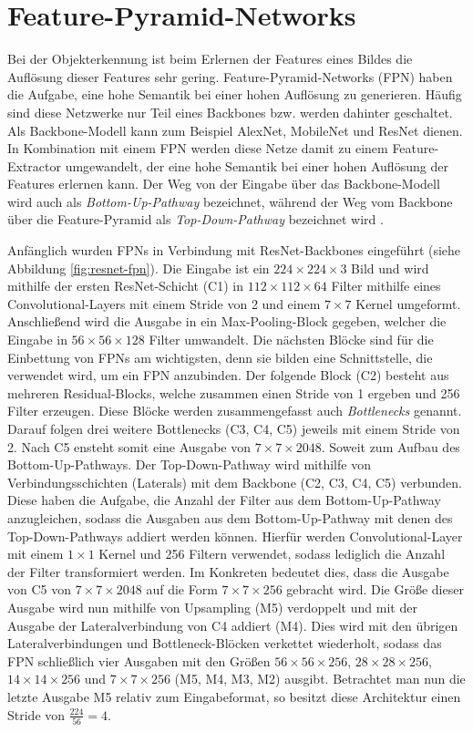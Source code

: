 \section{Feature-Pyramid-Networks}
Bei der Objekterkennung ist beim Erlernen der Features eines Bildes die
Auflösung dieser Features sehr gering. Feature-Pyramid-Networks (FPN) haben die
Aufgabe, eine hohe Semantik bei einer hohen Auflösung zu generieren. Häufig sind
diese Netzwerke nur Teil eines Backbones bzw. werden dahinter geschaltet. Als
Backbone-Modell kann zum Beispiel AlexNet, MobileNet und ResNet dienen. In
Kombination mit einem FPN werden diese Netze damit zu einem Feature-Extractor
umgewandelt, der eine hohe Semantik bei einer hohen Auflösung der Features
erlernen kann. Der Weg von der Eingabe über das Backbone-Modell wird auch als
\textit{Bottom-Up-Pathway} bezeichnet, während der Weg vom Backbone über die
Feature-Pyramid als \textit{Top-Down-Pathway} bezeichnet wird
\cite{lin2017feature}.

Anfänglich wurden FPNs in Verbindung mit ResNet-Backbones eingeführt (siehe
Abbildung \ref{fig:resnet-fpn}). Die Eingabe ist ein $224 \times 224 \times 3$
Bild und wird mithilfe der ersten ResNet-Schicht (C1) in $112 \times 112 \times
64$ Filter mithilfe eines Convolutional-Layers mit einem Stride von 2 und einem
$7 \times 7$ Kernel umgeformt. Anschließend wird die Ausgabe in ein
Max-Pooling-Block gegeben, welcher die Eingabe in $56 \times 56 \times 128$
Filter umwandelt. Die nächsten Blöcke sind für die Einbettung von FPNs am
wichtigsten, denn sie bilden eine Schnittstelle, die verwendet wird, um ein FPN anzubinden. Der folgende Block (C2) besteht aus mehreren Residual-Blocks,
welche zusammen einen Stride von 1 ergeben und 256 Filter erzeugen. Diese Blöcke
werden zusammengefasst auch \textit{Bottlenecks} genannt. Darauf folgen drei
weitere Bottlenecks (C3, C4, C5) jeweils mit einem Stride von 2. Nach C5 ensteht
somit eine Ausgabe von $7 \times 7 \times 2048$. Soweit zum Aufbau des
Bottom-Up-Pathways. Der Top-Down-Pathway wird mithilfe von Verbindungsschichten
(Laterals) mit dem Backbone (C2, C3, C4, C5) verbunden. Diese haben die Aufgabe, die Anzahl der
Filter aus dem Bottom-Up-Pathway anzugleichen, sodass die Ausgaben aus dem Bottom-Up-Pathway mit denen des Top-Down-Pathways addiert werden können. Hierfür werden
Convolutional-Layer mit einem $1 \times 1$ Kernel und 256 Filtern verwendet,
sodass lediglich die Anzahl der Filter transformiert werden. Im Konkreten
bedeutet dies, dass die Ausgabe von C5 von $7 \times 7 \times 2048$ auf die Form
$7 \times 7 \times 256$ gebracht wird.  Die Größe dieser Ausgabe wird nun
mithilfe von Upsampling (M5) verdoppelt und mit der Ausgabe der
Lateralverbindung von C4 addiert (M4). Dies wird mit den übrigen
Lateralverbindungen und Bottleneck-Blöcken verkettet wiederholt, sodass das FPN
schließlich vier Ausgaben mit den Größen $56 \times 56 \times 256$, $28 \times
28 \times 256$, $14 \times 14 \times 256$ und $7 \times 7 \times 256$ (M5, M4,
M3, M2) ausgibt. Betrachtet man nun die letzte Ausgabe M5 relativ zum
Eingabeformat, so besitzt diese Architektur einen Stride von $\frac{224}{56} = 4$.

